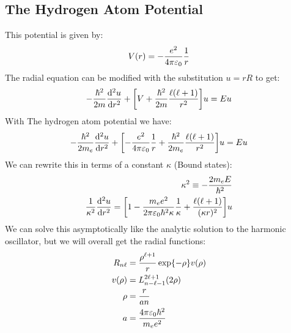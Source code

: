 \subsection{The Hydrogen Atom Potential}
This potential is given by:
\begin{align*}
  V(r)=-\dfrac{e^2}{4\pi\varepsilon_0}\dfrac{1}{r}
\end{align*}
The radial equation can be modified with the substitution $u=rR$ to get:
\begin{align*}
  -\dfrac{\hbar^2}{2m}\dv[2]{u}{r}+\qty[V+\dfrac{\hbar^2}{2m}\dfrac{\ell(\ell+1)}{r^2}]u
  =Eu
\end{align*}
With The hydrogen atom potential we have:
\begin{align*}
  -\dfrac{\hbar^2}{2m_e}\dv[2]{u}{r}+
  \qty[-\dfrac{e^2}{4\pi\varepsilon_0}\dfrac{1}{r}
    +\dfrac{\hbar^2}{2m_e}\dfrac{\ell(\ell+1)}{r^2}]u=Eu
\end{align*}
We can rewrite this in terms of a constant $\kappa$ (Bound states):
\begin{align*}
  \kappa^2\equiv-\dfrac{2m_eE}{\hbar^2}\\
  \dfrac{1}{\kappa^2}\dv[2]{u}{r}=
  \qty[1-\dfrac{m_ee^2}{2\pi\varepsilon_0\hbar^2\kappa}
    \dfrac{1}{\kappa}+\dfrac{\ell(\ell+1)}{(\kappa r)^2}]u
\end{align*}
We can solve this asymptotically like the analytic solution to the harmonic oscillator, but we will overall get the radial functions:
\begin{align*}
  R_{n\ell}&=\dfrac{\rho^{\ell+1}}{r}\exp{-\rho}v(\rho)\\
  v(\rho)&=L^{2\ell+1}_{n-\ell-1}(2\rho)\\
  \rho&=\dfrac{r}{an}\\
  a&=\dfrac{4\pi\varepsilon_0\hbar^2}{m_ee^2}
\end{align*}

